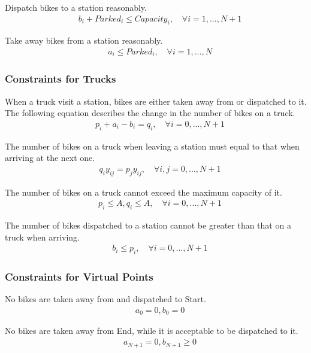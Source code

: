 \documentclass[a4paper, 12pt]{article}%
\theoremstyle{definition}
\begin{document}
\noindent Dispatch bikes to a station reasonably. 
\begin{align}
    \quad  b_i + Parked_i \leq Capacity_i, \quad  \forall i = 1,...,N+1
\end{align}

\noindent Take away bikes from a station reasonably.
\begin{align}
    \quad  a_i \leq Parked_i, \quad  \forall i = 1,...,N
\end{align}

\subsubsection{Constraints for Trucks}

\noindent When a truck visit a station, bikes are either taken away from or dispatched to it. The following equation describes the change in the number of bikes on a truck. 
\begin{align}
    \quad p_i + a_i - b_i = q_i, \quad \forall i = 0,...,N+1
\end{align}

\noindent The number of bikes on a truck when leaving a station must equal to that when arriving at the next one. 
\begin{align}
    \quad q_i y_{ij} = p_j y_{ij}, \quad \forall i,j = 0,...,N+1
\end{align}

\noindent The number of bikes on a truck cannot exceed the maximum capacity of it. 
\begin{align}
    \quad p_i \leq A, q_i \leq A, \quad \forall i = 0,...,N+1
\end{align}

\noindent The number of bikes dispatched to a station cannot be greater than that on a truck when arriving. 
\begin{align}
    \quad b_i \leq p_i, \quad \forall i = 0,...,N+1
\end{align}

\subsubsection{Constraints for Virtual Points}

\noindent No bikes are taken away from and dispatched to Start. 
\begin{align}
    \quad a_0 = 0, b_0 = 0
\end{align}

\noindent No bikes are taken away from End, while it is acceptable to be dispatched to it. 
\begin{align}
    \quad a_{N+1} = 0, b_{N+1} \geq 0
\end{align}
\end{document}
